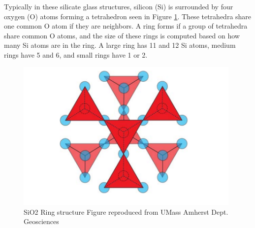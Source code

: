 Typically in these silicate glass structures, silicon (Si) is surrounded by four oxygen (O) atoms forming a tetrahedron seen in Figure \ref{SiO2}. These tetrahedra share one common O atom if they are neighbors. A ring forms if a group of tetrahedra share common O atoms, and the size of these rings is computed based on how many Si atoms are in the ring. A large ring has 11 and 12 Si atoms, medium rings have 5 and 6, and small rings have 1 or 2.

\begin{figure}[!h]
  \centering
  \includegraphics[width=11cm]{picture/SiO2Ring.PNG}
  \caption{SiO2 Ring structure
Figure reproduced from UMass Amherst Dept. Geosciences} 
  \label{SiO2}
\end{figure}

